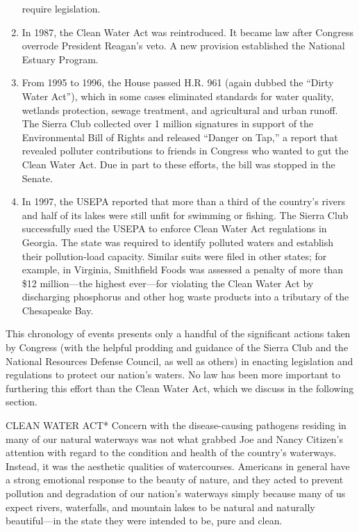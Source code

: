 \documentclass{article}
\begin{document}
\begin{enumerate}
  require legislation.
\item
  In 1987, the Clean Water Act was reintroduced. It became law after
  Congress overrode President Reagan's veto. A new provision established
  the National Estuary Program.
\item
  From 1995 to 1996, the House passed H.R. 961 (again dubbed the ``Dirty
  Water Act''), which in some cases eliminated standards for water
  quality, wetlands protection, sewage treatment, and agricultural and
  urban runoff. The Sierra Club collected over 1 million signatures in
  support of the Environmental Bill of Rights and released ``Danger on
  Tap,'' a report that revealed polluter contributions to friends in
  Congress who wanted to gut the Clean Water Act. Due in part to these
  efforts, the bill was stopped in the Senate.
\item
  In 1997, the USEPA reported that more than a third of the country's
  rivers and half of its lakes were still unfit for swimming or fishing.
  The Sierra Club successfully sued the USEPA to enforce Clean Water Act
  regulations in Georgia. The state was required to identify polluted
  waters and establish their pollution-load capacity. Similar suits were
  filed in other states; for example, in Virginia, Smithfield Foods was
  assessed a penalty of more than \$12 million---the highest ever---for
  violating the Clean Water Act by discharging phosphorus and other hog
  waste products into a tributary of the Chesapeake Bay.
\end{enumerate}

This chronology of events presents only a handful of the significant
actions taken by Congress (with the helpful prodding and guidance of the
Sierra Club and the National Resources Defense Council, as well as
others) in enacting legislation and regulations to protect our nation's
waters. No law has been more important to furthering this effort than
the Clean Water Act, which we discuss in the following section.

CLEAN WATER ACT* Concern with the disease-causing pathogens residing in
many of our natural waterways was not what grabbed Joe and Nancy
Citizen's attention with regard to the condition and health of the
country's waterways. Instead, it was the aesthetic qualities of
watercourses. Americans in general have a strong emotional response to
the beauty of nature, and they acted to prevent pollution and
degradation of our nation's waterways simply because many of us expect
rivers, waterfalls, and mountain lakes to be natural and naturally
beautiful---in the state they were intended to be, pure and clean.
\end{document}
